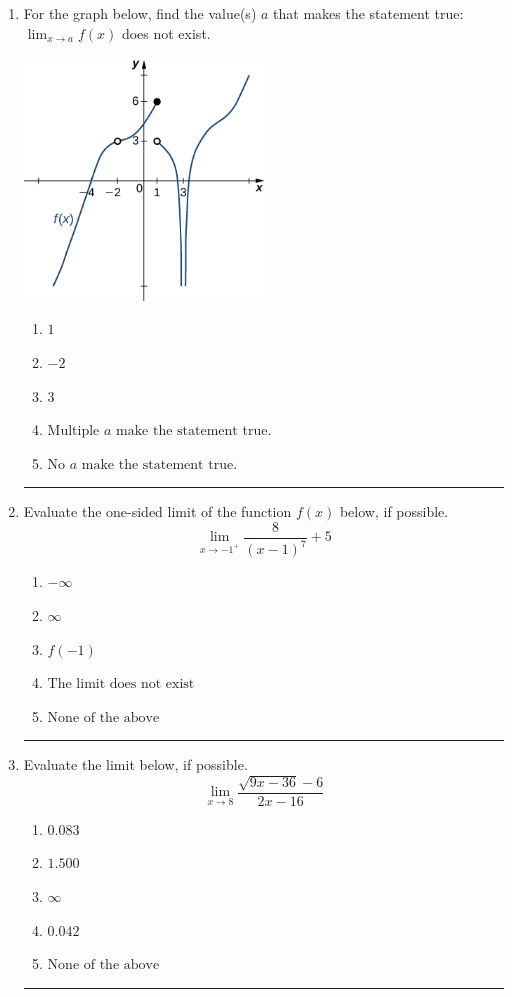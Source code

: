 \documentclass[14pt]{extbook}
\newcommand{\litem}[1]{\item#1\hspace*{-1cm}\rule{\textwidth}{0.4pt}}
\begin{document}
\begin{enumerate}
\litem{
For the graph below, find the value(s) $a$ that makes the statement true: $ \displaystyle \lim_{x \rightarrow a} f(x)$ does not exist.
\begin{center}
    \includegraphics[width=0.5\textwidth]{../Figures/evaluateLimitGraphicallyCopyA.png}
\end{center}
\begin{enumerate}[label=\Alph*.]
\item \( 1 \)
\item \( -2 \)
\item \( 3 \)
\item \( \text{Multiple } a \text{ make the statement true}. \)
\item \( \text{No } a \text{ make the statement true}. \)

\end{enumerate} }
\litem{
Evaluate the one-sided limit of the function $f(x)$ below, if possible.\[ \lim_{x \rightarrow -1^+} \frac{8}{(x-1)^7}+5 \]\begin{enumerate}[label=\Alph*.]
\item \( -\infty \)
\item \( \infty \)
\item \( f(-1) \)
\item \( \text{The limit does not exist} \)
\item \( \text{None of the above} \)

\end{enumerate} }
\litem{
Evaluate the limit below, if possible.\[ \lim_{x \rightarrow 8} \frac{\sqrt{9x - 36} - 6}{2x - 16} \]\begin{enumerate}[label=\Alph*.]
\item \( 0.083 \)
\item \( 1.500 \)
\item \( \infty \)
\item \( 0.042 \)
\item \( \text{None of the above} \)


\end{enumerate}}
\end{enumerate}
\end{document}
